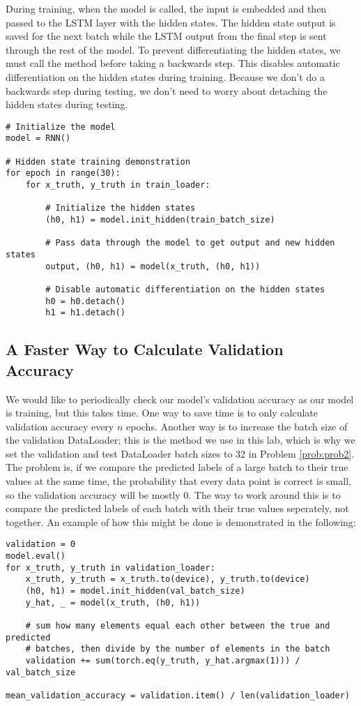 During training, when the model is called, the input is embedded and then passed to the LSTM layer with the hidden states.
The hidden state output is saved for the next batch while the LSTM output from the final step is sent through the rest of the model.
To prevent differentiating the hidden states, we must call the  method before taking a backwards step.
This disables automatic differentiation on the hidden states during training.
Because we don't do a backwards step during testing, we don't need to worry about detaching the hidden states during testing.

\begin{lstlisting}
# Initialize the model
model = RNN()

# Hidden state training demonstration
for epoch in range(30):
    for x_truth, y_truth in train_loader:

        # Initialize the hidden states
        (h0, h1) = model.init_hidden(train_batch_size)

        # Pass data through the model to get output and new hidden states
        output, (h0, h1) = model(x_truth, (h0, h1))

        # Disable automatic differentiation on the hidden states
        h0 = h0.detach()
        h1 = h1.detach()

\end{lstlisting}

\subsection*{A Faster Way to Calculate Validation Accuracy}
We would like to periodically check our model's validation accuracy as our model is training, but this takes time.
One way to save time is to only calculate validation accuracy every $n$ epochs.
Another way is to increase the batch size of the validation DataLoader; this is the method we use in this lab, which is why we set the validation and test DataLoader batch sizes to 32 in Problem \ref{prob:prob2}.
The problem is, if we compare the predicted labels of a large batch to their true values at the same time, the probability that every data point is correct is small, so the validation accuracy will be mostly 0.
The way to work around this is to compare the predicted labels of each batch with their true values seperately, not together.
An example of how this might be done is demonstrated in the following:

\begin{lstlisting}
validation = 0
model.eval()
for x_truth, y_truth in validation_loader:
    x_truth, y_truth = x_truth.to(device), y_truth.to(device)
    (h0, h1) = model.init_hidden(val_batch_size)
    y_hat, _ = model(x_truth, (h0, h1))

    # sum how many elements equal each other between the true and predicted
    # batches, then divide by the number of elements in the batch
    validation += sum(torch.eq(y_truth, y_hat.argmax(1))) / val_batch_size

mean_validation_accuracy = validation.item() / len(validation_loader)

\end{lstlisting}

